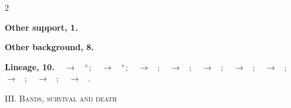 \documentclass[10pt]{article}
\newcommand{\memb}[1]{\par\smallskip\textbf{#1}\quad}
\begin{document}
\begin{multicols}{2}
\memb{Other support, 1.} \citetext{\citealp{Tiwari-emotion25}}

\memb{Other background, 8.} {\footnotesize \citetext{\citealp{Williams-homeostatic07}; \citealp{Barandiaran-adaptivity08}; \citealp{Egbert-minimal10}; \citealp{Barandiaran-norm14}; \citealp{Masumori-autonomous18}; \citealp{Schofer-regulatory25}; \citealp{Jin-homeostatic26}; \citealp{Schofer-boredom26}\dag}}

\end{multicols}
\memb{Lineage, 10.} {\footnotesize \citeauthor{Ashby-design52}~\citeyear{Ashby-design52} $\to$ \citeauthor{Conant-good70}~\citeyear{Conant-good70}$^\times$; \citeauthor{Ashby-design52}~\citeyear{Ashby-design52} $\to$ \citeauthor{Powers-feedback73}~\citeyear{Powers-feedback73}$^\times$; \citeauthor{Ashby-design52}~\citeyear{Ashby-design52} $\to$ \citeauthor{DiPaolo-homeostatic00}~\citeyear{DiPaolo-homeostatic00}; \citeauthor{Ashby-design52}~\citeyear{Ashby-design52} $\to$ \citeauthor{Ikegami-homeostatic08}~\citeyear{Ikegami-homeostatic08}; \citeauthor{Ashby-design52}~\citeyear{Ashby-design52} $\to$ \citeauthor{Yoshida-homeostatic17}~\citeyear{Yoshida-homeostatic17}; \citeauthor{Watson-biological83}~\citeyear{Watson-biological83} $\to$ \citeauthor{Ikegami-homeostatic08}~\citeyear{Ikegami-homeostatic08}; \citeauthor{Canamero-modeling97}~\citeyear{Canamero-modeling97} $\to$ \citeauthor{Lones-hormone18}~\citeyear{Lones-hormone18}; \citeauthor{DiPaolo-homeostatic00}~\citeyear{DiPaolo-homeostatic00} $\to$ \citeauthor{Man-need22}~\citeyear{Man-need22}; \citeauthor{Yu-boredom18}~\citeyear{Yu-boredom18} $\to$ \citeauthor{Schofer-regulatory25}~\citeyear{Schofer-regulatory25}; \citeauthor{Man-need22}~\citeyear{Man-need22} $\to$ \citeauthor{Tiwari-emotion25}~\citeyear{Tiwari-emotion25}.}

\medskip\textsc{III. Bands, survival and death}
\end{document}
